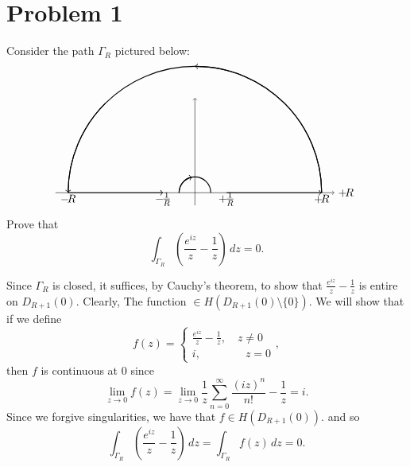 \documentclass[11pt]{article}
\newcommand{\sm}{\setminus}
\begin{document}
	
	\psetheader
\section*{Problem 1}
Consider the path $\Gamma_R$ pictured below:
\[\begin{tikzpicture}[scale=2]
  \draw[->] (-2.2,0) -- (2.2,0) node[right] {$+$\!$R$};
  \draw[->] (0,-0.2) -- (0,1.5);

  \draw[thick, <-] (-2,0) arc (180:135:2);
  \draw[thick] (-2,0) arc (180:0:2);
  \draw[thick, <-] (0,2) arc (90:0:2);
  
  \draw[thick] (-0.25,0) arc (180:0:0.25);
  \draw[thick,->] (-0.25,0) arc (180:100:0.25);

  \draw[thick, ->] (-2,0) -- (-0.5,0);
  \draw[thick, ->] (0.5,0) -- (2,0);

  \node at (-2, -0.1) {$-\!R$};
  \node at (-0.5, -0.1) {$-\!\frac{1}{R}$};
  \node at (0.5, -0.1) {$+\!\frac{1}{R}$};
  \node at (2, -0.1) {$+\!R$};
\end{tikzpicture}\]
Prove that 
\[\int_{\Gamma_R}(\frac{e^{iz}}{z} - \frac{1}{z})\,dz = 0.\]
\begin{solution}
    Since $\Gamma_R$ is closed, it suffices, by Cauchy's theorem, to show that $\frac{e^{iz}}{z} - \frac{1}{z}$ is entire on $D_{R + 1}(0).$ Clearly, The function $\in H(D_{R + 1}(0) \sm \{0\}).$ We will show that if we define 
    \[f(z)  = \begin{cases}
        \frac{e^{iz}}{z} - \frac{1}{z}, \quad z\neq 0\\
        i, \qquad \qquad z = 0
    \end{cases},\] then $f$ is continuous at $0$ since
    \[\lim_{z\to 0} f(z) = \lim_{z\to 0} \frac{1}{z}\sum_{n=0}^\infty \frac{(iz)^n}{n!} - \frac{1}{z} = i.\] Since we forgive singularities, we have that $f \in H(D_{R + 1}(0)).$ and so 
    \[\int_{\Gamma_R}(\frac{e^{iz}}{z} - \frac{1}{z}) \, dz = \int_{\Gamma_R}f(z)\, dz = 0.\]
\end{solution}


\newpage
\end{document}
